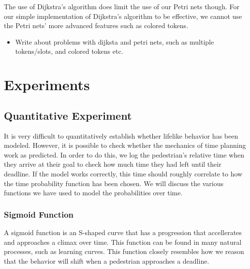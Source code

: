 \documentclass[11pt]{article}
\begin{document}
The use of Dijkstra's algorithm does limit the use of our Petri nets though. For our simple implementation of Dijkstra's algorithm to be effective, we cannot use the Petri nets' more advanced features such as colored tokens.

\begin{itemize}
\item Write about problems with dijksta and petri nets, such as multiple tokens/slots, and colored tokens etc.
\end{itemize}



\section{Experiments}

\subsection{Quantitative Experiment}
It is very difficult to quantitatively establish whether lifelike behavior has been modeled. However, it is possible to check whether the mechanics of time planning work as predicted. In order to do this, we log the pedestrian's relative time when they arrive at their goal to check how much time they had left until their deadline. If the model works correctly, this time should roughly correlate to how the time probability function has been chosen. We will discuss the various functions we have used to model the probabilities over time.

\subsubsection{Sigmoid Function}
A sigmoid function is an S-shaped curve that has a progression that accellerates and approaches a climax over time. This function can be found in many natural processes, such as learning curves. This function closely resembles how we reason that the behavior will shift when a pedestrian approaches a deadline.

\end{document}
